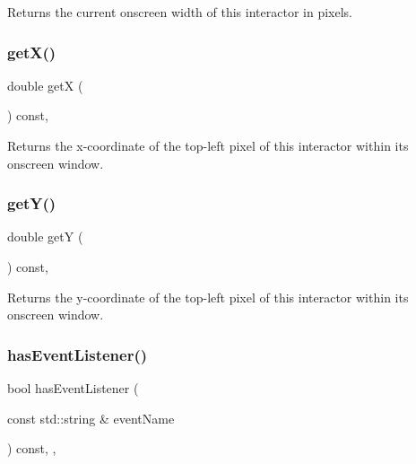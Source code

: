 Returns the current onscreen width of this interactor in pixels. 

\mbox{\label{classGInteractor_a344385751bee0720059403940d57a13e}} 
\subsubsection{\texorpdfstring{get\+X()}{getX()}}
{\footnotesize\ttfamily double getX (\begin{DoxyParamCaption}{ }\end{DoxyParamCaption}) const\hspace{0.3cm}{\ttfamily [virtual]}, {\ttfamily [inherited]}}



Returns the x-\/coordinate of the top-\/left pixel of this interactor within its onscreen window. 

\mbox{\label{classGInteractor_aafa51c7f8f38a09febbb9ce7853f77b4}} 
\subsubsection{\texorpdfstring{get\+Y()}{getY()}}
{\footnotesize\ttfamily double getY (\begin{DoxyParamCaption}{ }\end{DoxyParamCaption}) const\hspace{0.3cm}{\ttfamily [virtual]}, {\ttfamily [inherited]}}



Returns the y-\/coordinate of the top-\/left pixel of this interactor within its onscreen window. 

\mbox{\label{classGObservable_a9f6faaa25942923bafa1c44020c49fa9}} 
\subsubsection{\texorpdfstring{has\+Event\+Listener()}{hasEventListener()}}
{\footnotesize\ttfamily bool has\+Event\+Listener (\begin{DoxyParamCaption}\item[{const std\+::string \&}]{event\+Name }\end{DoxyParamCaption}) const\hspace{0.3cm}{\ttfamily [protected]}, {\ttfamily [virtual]}, {\ttfamily [inherited]}}



